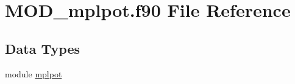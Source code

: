 \hypertarget{MOD__mplpot_8f90}{\section{M\-O\-D\-\_\-mplpot.\-f90 File Reference}
\label{MOD__mplpot_8f90}
}
\subsection*{Data Types}
\begin{DoxyCompactItemize}
\item 
module \hyperlink{classmplpot}{mplpot}
\end{DoxyCompactItemize}

